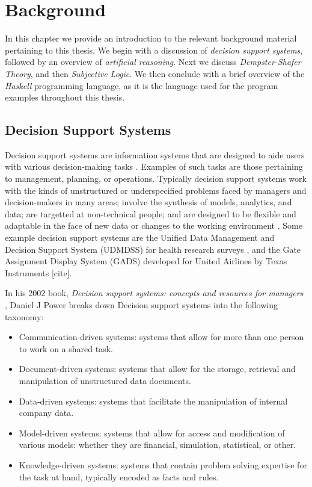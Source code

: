 \documentclass[thesis.tex]{subfiles}
\begin{document}
\chapter{Background}
\label{chap:background-information}

In this chapter we provide an introduction to the relevant background material pertaining
to this thesis. We begin with a discussion of \emph{decision support systems}, followed by
an overview of \emph{artificial reasoning}. Next we discuss \emph{Dempster-Shafer Theory}, and
then \emph{Subjective Logic}. We then conclude with
a brief overview of the \emph{Haskell} programming language, as it is the language used for the program
examples throughout this thesis.



\section{Decision Support Systems}

Decision support systems are information systems that are designed to aide users with various
decision-making tasks \cite{sprague1980framework}. Examples of such tasks are those pertaining to management,
planning, or operations. Typically decision support systems work with the kinds of unstructured
or underspecified problems faced by managers and decision-makers in many areas; involve the
synthesis of models, analytics, and data; are targetted at non-technical people; and are designed
to be flexible and adaptable in the face of new data or changes to the working environment
\cite{sprague1980framework}. Some example decision support systems are the
Unified Data Management and Decision Support System (UDMDSS)
for health research surveys \cite{kent2010application},
and the Gate Assignment Display System (GADS) developed for United Airlines
by Texas Instruments [cite].

In his 2002 book, \emph{Decision support systems: concepts and resources for managers}
\cite{power2002decision}, Daniel J Power breaks down Decision support systems into the following
taxonomy:

\begin{itemize}
  \item Communication-driven systems: systems that allow for more than
    one person to work on a shared task.
  \item Document-driven systems: systems that allow for the storage,
    retrieval and manipulation of unstructured data documents.
  \item Data-driven systems: systems that facilitate the manipulation
    of internal company data.
  \item Model-driven systems: systems that allow for access and
    modification of various models: whether they are financial,
    simulation, statistical, or other.
  \item Knowledge-driven systems: systems that contain problem solving
    expertise for the task at hand, typically encoded as facts and
    rules.
\end{itemize}
\end{document}

